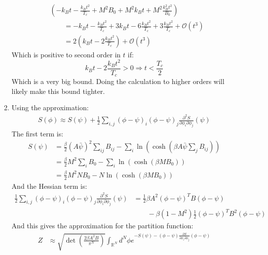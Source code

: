 \documentclass[12pt,a4]{article}
\begin{document}
\begin{enumerate}
\begin{enumerate}
        \begin{align*}
          &\left(- k_B t - \frac{k_B t^2}{T_c} + M^2 B_0 + M^2 k_B t + M^2 \frac{k_B^2 t^2}{B_0}\right)\\
          &\qquad = - k_B t  - \frac{k_B t^2}{T_c} + 3 k_B t - 6 \frac{k_B t^2}{T_c} + 3\frac{k_B t^2}{T_c} + \mathcal{O}(t^3)\\
          &\qquad = 2 \left(k_B t - 2 \frac{k_B t^2}{T_c} \right) + \mathcal{O}(t^3)
        \end{align*}
        Which is positive to second order in $t$ if:
        \begin{equation*}
          k_B t - 2 \frac{k_B t^2}{T_c} > 0 \Rightarrow t < \frac{T_c}{2}
        \end{equation*}
        Which is a very big bound.
        Doing the calculation to higher orders will likely make this bound tighter.
      \item
        Using the approximation:
        \begin{align*}
          S(\phi) \approx S(\psi) + \frac{1}{2}\sum_{i,j}(\phi - \psi)_i (\phi - \psi)_j \frac{\partial^2 S}{\partial \phi_i \partial \phi_j}(\psi)
        \end{align*}
        The first term is:
        \begin{align*}
          S(\psi) &= \frac{\beta}{2} (A\bar{\psi})^2 \sum_{i j} B_{ij} - \sum_i \ln(\cosh(\beta A\bar{\psi}\sum_jB_{ij}))\\
                  &= \frac{\beta}{2} M^2 \sum_{i } B_{0} - \sum_i \ln(\cosh(\beta M B_0))\\
                  &= \frac{\beta}{2} M^2 N B_{0} - N \ln(\cosh(\beta M B_0))
        \end{align*}
        And the Hessian term is:
        \begin{align*}
          \frac{1}{2}\sum_{i,j}(\phi - \psi)_i (\phi - \psi)_j \frac{\partial^2 S}{\partial \phi_i \partial \phi_j}(\psi) &= \frac{1}{2}\beta A^2 (\phi - \psi)^T B (\phi - \psi)  \\
               & \qquad   - \beta \left(1 - M^2\right) \frac{1}{2}(\phi - \psi)^T B^2 (\phi - \psi)
        \end{align*}
        And this gives the approximation for the partition function:
        \begin{align*}
          Z &\approx \sqrt{\det\left(\frac{2 \beta A^2 B}{\pi^N}\right)} \int_{\mathbb{R}^N} d^N \phi e^{-S(\psi) - (\phi - \psi) \frac{\partial S}{\partial \phi_i \partial \phi_j} (\phi - \psi)}\\

\end{align*}
\end{enumerate}
\end{enumerate}
\end{document}
